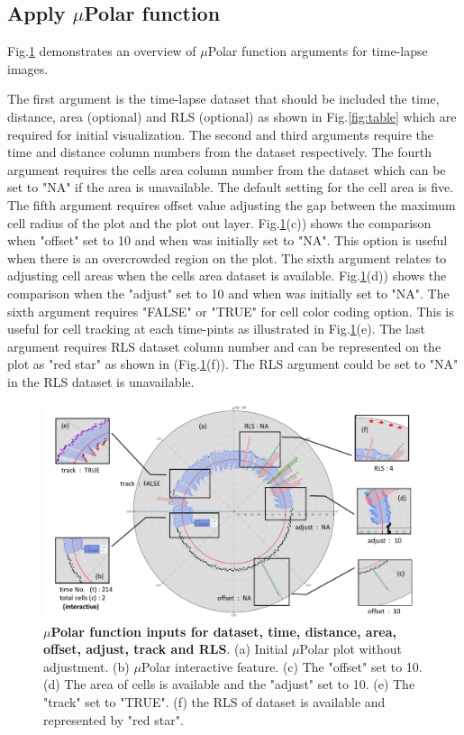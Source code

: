 \documentclass[conference]{IEEEtran}
\begin{document}
\subsection{Apply $\mu$Polar function}

Fig.\ref{fig:label} demonstrates an overview of $\mu$Polar function arguments for time-lapse images.

The first argument is the time-lapse dataset that should be included the time, distance, area (optional) and RLS (optional) as shown in Fig.\ref{fig:table} which are required for initial visualization. The second and third arguments require the time and distance column numbers from the dataset respectively. The fourth argument requires the cells area column number from the dataset which can be set to "NA" if the area is unavailable. The default setting for the cell area is five. The fifth argument requires offset value adjusting the gap between the maximum cell radius of the plot and the plot out layer. Fig.\ref{fig:label}(c)) shows the comparison when "offset" set to 10 and when was initially set to "NA". This option is useful when there is an overcrowded region on the plot. The sixth argument relates to adjusting cell areas when the cells area dataset is available. Fig.\ref{fig:label}(d)) shows the comparison when the "adjust" set to 10 and when was initially set to "NA". The sixth argument requires "FALSE" or "TRUE" for cell color coding option. This is useful for cell tracking at each time-pints as illustrated in Fig.\ref{fig:label}(e). The last argument requires RLS dataset column number and can be represented on the plot as "red star" as shown in (Fig.\ref{fig:label}(f)). The RLS argument could be set to "NA" in the RLS dataset is unavailable.


\begin{figure}
\centering
\includegraphics[width=\textwidth,height=10 cm]{Patterns/option.pdf}
\caption{ \textbf{ $\mu$Polar function inputs for dataset, time, distance, area, offset, adjust, track and RLS}. (a) Initial $\mu$Polar plot without adjustment. (b) $\mu$Polar interactive feature. (c) The "offset" set to 10. (d) The area of cells is available and the "adjust" set to 10. (e) The "track" set to "TRUE". (f) the RLS of dataset is available and represented by "red star".}
\label{fig:label}
\end{figure}
\end{document}
